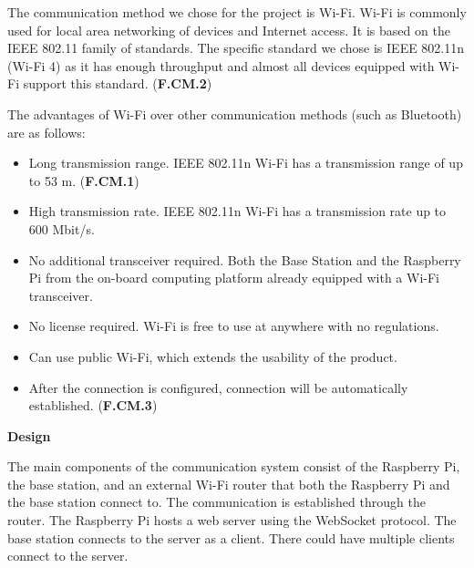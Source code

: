 The communication method we chose for the project is Wi-Fi. Wi-Fi is commonly used for local area networking of devices and Internet access. It is based on the IEEE 802.11 family of standards. The specific standard we chose is IEEE 802.11n (Wi-Fi 4) as it has enough throughput and almost all devices equipped with Wi-Fi support this standard. (\textbf{F.CM.2})

The advantages of Wi-Fi over other communication methods (such as Bluetooth) are as follows:
\begin{itemize}
    \item Long transmission range. IEEE 802.11n Wi-Fi has a transmission range of up to 53 m. (\textbf{F.CM.1})
    \item High transmission rate. IEEE 802.11n Wi-Fi has a transmission rate up to 600 Mbit/s.
    \item No additional transceiver required. Both the Base Station and the Raspberry Pi from the on-board computing platform already equipped with a Wi-Fi transceiver.
    \item No license required. Wi-Fi is free to use at anywhere with no regulations.
    \item Can use public Wi-Fi, which extends the usability of the product.
    \item After the connection is configured, connection will be automatically established. (\textbf{F.CM.3})
\end{itemize}

\textbf{Design}

The main components of the communication system consist of the Raspberry Pi, the base station, and an external Wi-Fi router that both the Raspberry Pi and the base station connect to. The communication is established through the router. The Raspberry Pi hosts a web server using the WebSocket protocol. The base station connects to the server as a client. There could have multiple clients connect to the server.
